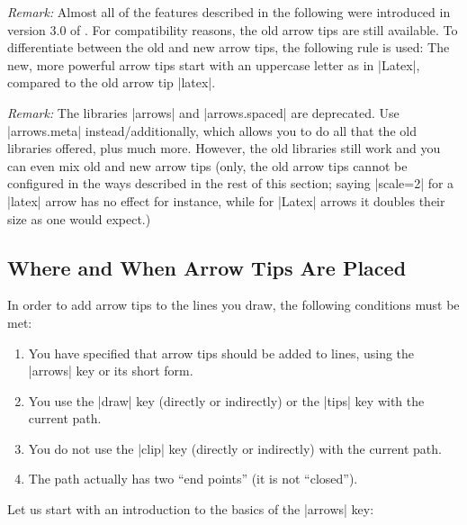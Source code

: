 \emph{Remark:} Almost all of the features described in the following
were introduced in version 3.0 of \tikzname. For compatibility
reasons, the old arrow tips are still available. To differentiate
between the old and new arrow tips, the following rule is used: The
new, more powerful arrow tips start with an uppercase letter as in
|Latex|, compared to the old arrow tip |latex|.

\emph{Remark:} The libraries |arrows| and |arrows.spaced| are
deprecated. Use |arrows.meta| instead/additionally, which allows you
to do all that the old libraries offered, plus much more. However, the
old libraries still work and you can even mix old and new arrow tips
(only, the old arrow tips cannot be configured in the ways described
in the rest of this section; saying |scale=2| for a |latex| arrow has
no effect for instance, while for |Latex| arrows it doubles their size
as one would expect.)


\subsection{Where and When Arrow Tips Are Placed}
\label{section-arrow-tips-where}

In order to add arrow tips to the lines you draw, the following
conditions must be met:

\begin{enumerate}
\item You have specified that arrow tips should be added to 
  lines, using the |arrows| key or its short form.
\item You use the |draw| key (directly or indirectly) or the |tips|
  key with the current path. 
\item You do not use the |clip| key (directly or indirectly) with the current
  path. 
\item The path actually has two ``end points'' (it is not
  ``closed'').
\end{enumerate}

Let us start with an introduction to the basics of the |arrows| key: 

